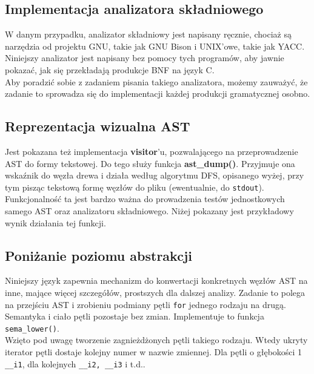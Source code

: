 		\subsection{Implementacja analizatora składniowego}
			
			W danym przypadku, analizator składniowy jest napisany ręcznie, chociaż są narzędzia od
			projektu GNU, takie jak GNU Bison i UNIX'owe, takie jak YACC. Niniejszy analizator
		  	jest napisany bez pomocy tych programów, aby jawnie pokazać, jak się przekładają
		  	produkcje BNF na język C.
		  	\\
		  	
		  	Aby poradzić sobie z zadaniem pisania takiego analizatora, możemy zauważyć, że
		  	zadanie to sprowadza się do implementacji każdej produkcji gramatycznej osobno.
	  	
	  	\subsection{Reprezentacja wizualna AST}
	  		
	  		Jest pokazana też implementacja \textbf{visitor}'u, pozwalającego na przeprowadzenie AST
			do formy tekstowej. Do tego służy funkcja \textbf{ast_dump()}. Przyjmuje ona wskaźnik do
			węzła drewa i działa według algorytmu DFS, opisanego wyżej, przy tym pisząc tekstową formę
			węzłów do pliku (ewentualnie, do \texttt{stdout}). Funkcjonalność ta jest bardzo ważna do
			prowadzenia testów jednostkowych samego AST oraz analizatoru składniowego.
			Niżej pokazany jest przykładowy wynik działania tej funkcji.
			\\
	
			

		\subsection{Poniżanie poziomu abstrakcji}
			
			Niniejszy język zapewnia mechanizm do konwertacji konkretnych
			węzłów AST na inne, mające więcej szczegółów, prostszych dla
			dalszej analizy. Zadanie to polega na przejściu AST i zrobieniu
			podmiany pętli \texttt{for} jednego rodzaju na drugą. Semantyka i
			ciało pętli pozostaje bez zmian. Implementuje to funkcja \texttt{sema\_lower()}.
			\\

			Wzięto pod uwagę tworzenie zagnieżdżonych pętli
			takiego rodzaju. Wtedy ukryty iterator pętli dostaje kolejny numer
			w nazwie zmiennej. Dla pętli o głębokości 1 \texttt{__i1}, dla kolejnych
			\texttt{__i2, __i3} i t.d..
			\\
			
